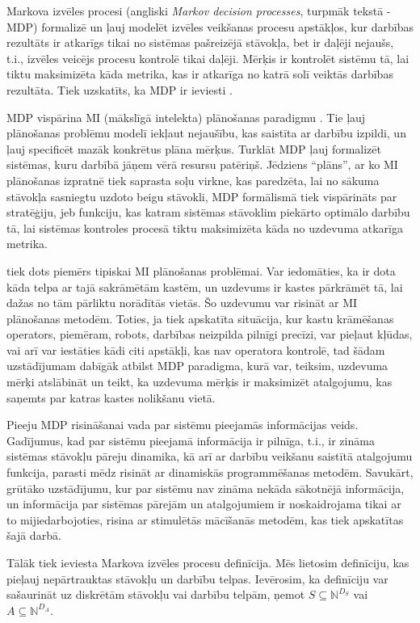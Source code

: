 \documentclass{ludis} %
\begin{document}
Markova izvēles procesi (angliski \textit{Markov decision processes}, turpmāk
tekstā - MDP) formalizē un ļauj modelēt izvēles veikšanas procesu apstākļos, kur
darbības rezultāts ir atkarīgs tikai no sistēmas pašreizējā stāvokļa, bet ir
daļēji nejaušs, t.i., izvēles veicējs procesu kontrolē tikai daļēji. Mērķis ir
kontrolēt sistēmu tā, lai tiktu maksimizēta kāda metrika, kas ir atkarīga no
katrā solī veiktās darbības rezultāta. Tiek uzskatīts, ka MDP ir ieviesti
\autocite{Bel}.

MDP vispārina MI (mākslīgā intelekta) plānošanas paradigmu
\autocite{Hendler1990ai}. Tie ļauj plānošanas problēmu modelī iekļaut nejaušību,
kas saistīta ar darbību izpildi, un ļauj specificēt mazāk konkrētus plāna
mērķus. Turklāt MDP ļauj formalizēt sistēmas, kuru darbībā jāņem vērā resursu
patēriņš. Jēdziens ``plāns'', ar ko MI plānošanas izpratnē tiek saprasta soļu
virkne, kas paredzēta, lai no
sākuma stāvokļa sasniegtu uzdoto beigu stāvokli, MDP formālismā tiek vispārināts
par stratēģiju, jeb funkciju, kas katram sistēmas stāvoklim piekārto optimālo
darbību tā, lai sistēmas kontroles procesā tiktu maksimizēta kāda no uzdevuma
atkarīga metrika.

\autocite{Otterlo} tiek dots piemērs tipiskai MI plānošanas problēmai. Var
iedomāties, ka ir dota kāda telpa ar tajā sakrāmētām kastēm, un uzdevums ir
kastes pārkrāmēt tā, lai dažas no tām pārliktu norādītās vietās. Šo uzdevumu var
risināt ar MI plānošanas metodēm. Toties, ja tiek apskatīta situācija, kur kastu
krāmēšanas operators, piemēram, robots, darbības neizpilda pilnīgi precīzi,
var pieļaut kļūdas, vai arī var iestāties kādi citi apstākļi, kas nav operatora
kontrolē, tad šādam uzstādījumam dabīgāk atbilst MDP paradigma, kurā var,
teiksim, uzdevuma mērķi atslābināt un teikt, ka uzdevuma mērķis ir maksimizēt
atalgojumu, kas saņemts par katras kastes nolikšanu vietā.

Pieeju MDP risināšanai vada par sistēmu pieejamās informācijas veids. Gadījumus,
kad par sistēmu pieejamā informācija ir pilnīga, t.i., ir zināma sistēmas
stāvokļu pāreju dinamika, kā arī ar darbību veikšanu saistītā atalgojumu
funkcija, parasti mēdz risināt ar dinamiskās programmēšanas metodēm. Savukārt,
grūtāko uzstādījumu, kur par sistēmu nav zināma nekāda sākotnējā informācija, un
informācija par sistēmas pārejām un atalgojumiem ir noskaidrojama tikai ar to
mijiedarbojoties, risina ar stimulētās mācīšanās metodēm, kas tiek apskatītas
šajā darbā.

Tālāk tiek ieviesta Markova izvēles procesu definīcija. Mēs lietosim definīciju,
kas pieļauj nepārtrauktas stāvokļu un darbību telpas. Ievērosim, ka definīciju
var sašaurināt uz diskrētām stāvokļu vai darbību telpām, ņemot $S \subseteq
\mathbb{N}^{D_S}$ vai $A \subseteq \mathbb{N}^{D_A}$.
\end{document}
